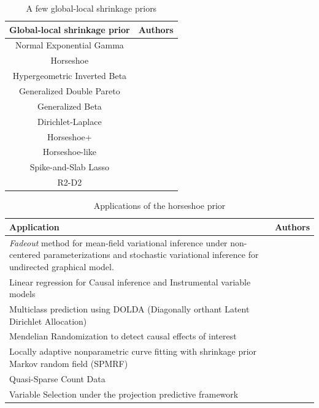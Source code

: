 \documentclass[11pt]{article}
\begin{document}
\begin{table}[htbp]
  \centering
  \caption{A few global-local shrinkage priors}
  \footnotesize{
    \begin{tabular}{|c|c|}
    \hline
    Global-local shrinkage prior  & Authors  \bigstrut\\
    \hline
    Normal Exponential Gamma & \citet{griffin2005alternative} \bigstrut[t]\\
    Horseshoe & \citet{carvalho2010horseshoe, carvalho2009handling} \\
    Hypergeometric Inverted Beta & \citet{polson2010large} \\
    Generalized Double Pareto & \citet{armagan2011generalized} \\
    Generalized Beta  & \citet{armagan2013generalized} \\
    Dirichlet-Laplace & \citet{bhattacharya2014dirichlet} \\
    Horseshoe+  & \citet{bhadra2015horseshoe+} \\
    Horseshoe-like & \citet{bhadra2017horseshoe} \\
    Spike-and-Slab Lasso & \citet{rovckova2016spike} \\
    R2-D2 & \citet{zhang2016high} \bigstrut[b]\\
    \hline
    \end{tabular}%
    }
  \label{tab:one-gps}%
\end{table}%

\begin{table}[htbp]
  \centering
  \caption{Applications of the horseshoe prior}
  \footnotesize{
    \begin{tabular}{|p{3in}|p{1.5in}|}
    \hline
    Application  & Authors \bigstrut\\
    \hline
    \textit{Fadeout} method for mean-field variational inference under non-centered parameterizations and stochastic variational inference for undirected graphical model.  & \citet{ingraham_bayesian_2016} \bigstrut[t]\\
    \hline
    Linear regression for Causal inference and Instrumental variable models  & \citet{hahn_shrinkage_2014, hahn_elliptical_2016} \\
    \hline
    Multiclass prediction using DOLDA (Diagonally orthant Latent Dirichlet Allocation)  & \citet{magnusson_dolda_2016} \\
    \hline
    Mendelian Randomization to detect causal effects of interest & \citet{berzuini_mendelian_2016} \\
    \hline 
    Locally adaptive nonparametric curve fitting with shrinkage prior Markov random field (SPMRF) & \citet{faulkner_bayesian_2015} \\
    \hline
    Quasi-Sparse Count Data & \citet{datta2016bayesian} \\
    \hline
    Variable Selection under the projection predictive framework  & \citet{piironen_projection_2015} \bigstrut[b]\\
    \hline
    \end{tabular}%
    }
  \label{tab:hs-apps}%
\end{table}%
\end{document}
